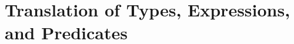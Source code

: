 \section{Translation of Types, Expressions, and Predicates}
\label{sec:translation-types-expressions-predicates}

